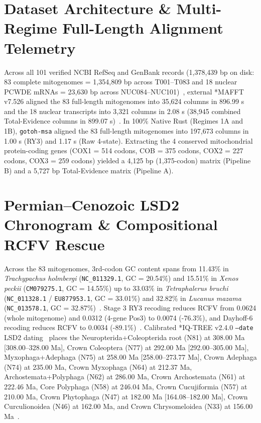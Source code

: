 \documentclass[10pt,letterpaper]{article}
\begin{document}
\section{Dataset Architecture \& Multi-Regime Full-Length Alignment Telemetry}
Across all 101 verified NCBI RefSeq and GenBank records (1,378,439 bp on disk: 83 complete mitogenomes = 1,354,809 bp across T001--T083 and 18 nuclear PCWDE mRNAs = 23,630 bp across NUC084--NUC101)~\cite{White2026RuNIE,McKenna2019,Kirsch2014,Zhang2018}, external *MAFFT v7.526 aligned the 83 full-length mitogenomes into 35,624 columns in 896.99 s and the 18 nuclear transcripts into 3,321 columns in 2.08 s (38,945 combined Total-Evidence columns in 899.07 s)~\cite{Katoh2013}. In 100\% Native Rust (Regimes 1A and 1B), \texttt{gotoh-msa} aligned the 83 full-length mitogenomes into 197,673 columns in 1.00 s (RY3) and 1.17 s (Raw 4-state). Extracting the 4 conserved mitochondrial protein-coding genes (COX1 = 514 codons, COB = 375 codons, COX2 = 227 codons, COX3 = 259 codons) yielded a 4,125 bp (1,375-codon) matrix (Pipeline B) and a 5,727 bp Total-Evidence matrix (Pipeline A).

\section{Permian--Cenozoic LSD2 Chronogram \& Compositional RCFV Rescue}
Across the 83 mitogenomes, 3rd-codon GC content spans from 11.43\% in \textit{Trachypachus holmbergi} (\texttt{NC\_011329.1}, GC = 20.54\%) and 15.51\% in \textit{Xenos peckii} (\texttt{CM079275.1}, GC = 14.55\%) up to 33.03\% in \textit{Tetraphalerus bruchi} (\texttt{NC\_011328.1} / \texttt{EU877953.1}, GC = 33.01\%) and 32.82\% in \textit{Lucanus mazama} (\texttt{NC\_013578.1}, GC = 32.87\%)~\cite{Niehuis2012,Sheffield2008,Sheffield2009}. Stage 3 RY3 recoding reduces RCFV from 0.0624 (whole mitogenome) and 0.0312 (4-gene Pos3) to 0.0074 (-76.3\%), and Dayhoff-6 recoding reduces RCFV to 0.0034 (-89.1\%)~\cite{Susko2007}. Calibrated *IQ-TREE v2.4.0 \texttt{--date} LSD2 dating~\cite{Minh2020,To2016} places the Neuropterida+Coleopterida root (N81) at 308.00 Ma [308.00--328.00 Ma], Crown Coleoptera (N77) at 292.00 Ma [292.00--305.00 Ma], Myxophaga+Adephaga (N75) at 258.00 Ma [258.00--273.77 Ma], Crown Adephaga (N74) at 235.00 Ma, Crown Myxophaga (N64) at 212.37 Ma, Archostemata+Polyphaga (N62) at 286.00 Ma, Crown Archostemata (N61) at 222.46 Ma, Core Polyphaga (N58) at 246.04 Ma, Crown Cucujiformia (N57) at 210.00 Ma, Crown Phytophaga (N47) at 182.00 Ma [164.08--182.00 Ma], Crown Curculionoidea (N46) at 162.00 Ma, and Crown Chrysomeloidea (N33) at 156.00 Ma~\cite{Kirejtshuk2014,Cai2022,Shin2018}.
\end{document}
